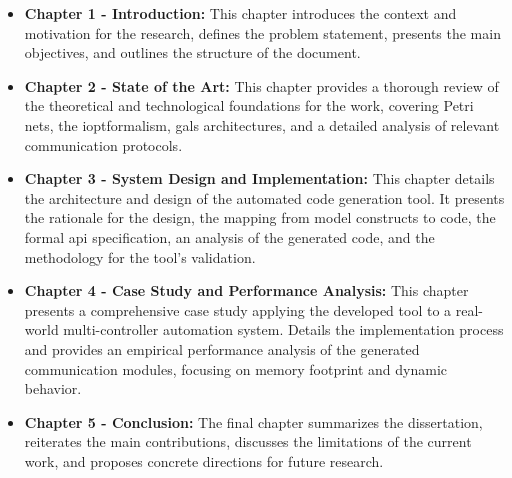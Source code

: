 \begin{itemize}
    \item \textbf{Chapter 1 - Introduction:} This chapter introduces the context and motivation for the research, defines the problem statement, presents the main objectives, and outlines the structure of the document.

    \item \textbf{Chapter 2 - State of the Art:} This chapter provides a thorough review of the theoretical and technological foundations for the work, covering Petri nets, the \gls{iopt}formalism, \gls{gals} architectures, and a detailed analysis of relevant communication protocols.

    \item \textbf{Chapter 3 - System Design and Implementation:} This chapter details the architecture and design of the automated code generation tool. It presents the rationale for the design, the mapping from model constructs to code, the formal \gls{api} specification, an analysis of the generated code, and the methodology for the tool's validation.

    \item \textbf{Chapter 4 - Case Study and Performance Analysis:} This chapter presents a comprehensive case study applying the developed tool to a real-world multi-controller automation system. Details the implementation process and provides an empirical performance analysis of the generated communication modules, focusing on memory footprint and dynamic behavior.

    \item \textbf{Chapter 5 - Conclusion:} The final chapter summarizes the dissertation, reiterates the main contributions, discusses the limitations of the current work, and proposes concrete directions for future research.
\end{itemize}


